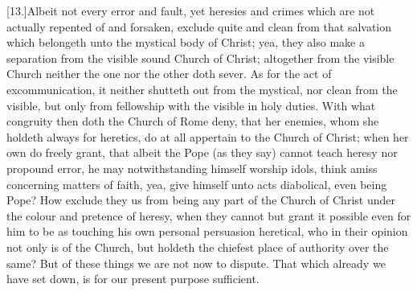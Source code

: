 [13.]Albeit not every error and fault, yet heresies and crimes which are not actually repented of and forsaken, exclude quite and clean from that salvation which belongeth unto the mystical body of Christ; yea, they also make a separation from the visible sound Church of Christ; altogether from the visible Church neither the one nor the other doth sever. As for the act of excommunication, it neither shutteth out from the mystical, nor clean from the visible, but only from fellowship with the visible in holy duties. With what congruity then doth the Church of Rome deny, that her enemies, whom she holdeth always for heretics, do at all appertain to the Church of Christ; when her own do freely grant, that albeit the Pope (as they say) cannot teach heresy nor propound error, he may notwithstanding himself worship idols, think amiss concerning matters of faith, yea, give himself unto acts diabolical, even being Pope? How exclude they us from being any part of the Church of Christ under the colour and pretence of heresy, when they cannot but grant it possible even for him to be as touching his own personal persuasion  heretical, who in their opinion not only is of the Church, but holdeth the chiefest place of authority over the same? But of these things we are not now to dispute. That which already we have set down, is for our present purpose sufficient.

